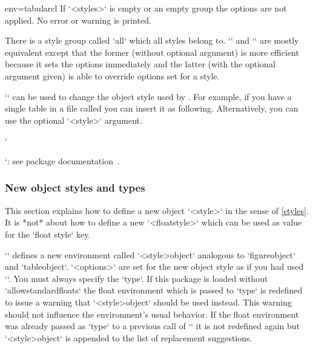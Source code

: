 \begin{tableobject}{env=tabular}{cl}
If `<styles>` is empty or an empty group the options are not applied.
No error or warning is printed.

There is a style group called `all` which all styles belong to.
`` and `` are mostly equivalent
except that the former (without optional argument) is more efficient because it sets the options immediately
and the latter (with the optional argument given) is able to override options set for a style.


\DescribeMacro{\graphicobjectstyle}
`` can be used to change the object style used by .
For example, if you have a single table in a file called  you can insert it as following.
Alternatively, you can use the optional `<style>` argument.

\begin{examplecode}
\begingroup
{}
\endgroup
\end{examplecode}


\DescribeMacro{\graphicspath}
`\graphicspath{{path/}}`: see  package documentation~\autocite[section~4.5]{graphicx}.


\subsubsection{New object styles and types}
\label{new-object-styles-and-types}

This section explains how to define a new object `<style>` in the sense of \cref{styles}.
It is *not* about how to define a new `<floatstyle>` which can be used as value for the `float style` key.

\DescribeMacro{\NewObjectStyle}
``
defines a new environment called `<style>object` analogous to `figureobject` and `tableobject`.
`<options>` are set for the new object style as if you had used ``.
You must always specify the `type`.
If this package is loaded without `allowstandardfloats`
the float environment which is passed to `type` is redefined to issue a warning that `<style>object` should be used instead.
This warning should not influence the environment's usual behavior.
If the float environment was already passed as `type` to a previous call of `\NewObjectStyle` it is not redefined again but `<style>object` is appended to the list of replacement suggestions.


\end{tableobject}
